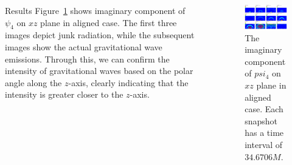 \documentclass[noamssymb]{beamer}
\newlength{\sepwidth}
\newlength{\colwidth}
\newcommand{\separatorcolumn}{\begin{column}{\sepwidth}\end{column}}
\begin{document}
\begin{frame}[t]
\begin{columns}[t]
\begin{column}{\colwidth}
\begin{block}{Results}
    Figure~\ref{fig:psi4i} shows imaginary component of $\psi_4$ on $xz$ plane in aligned case. The first three images depict junk radiation, while the subsequent images show the actual gravitational wave emissions. Through this, we can confirm the intensity of gravitational waves based on the polar angle along the $z$-axis, clearly indicating that the intensity is greater closer to the $z$-axis.

  \end{block}


\end{column}

\separatorcolumn

\begin{column}{\colwidth}

  \begin{block}{}
  	
  	\begin{figure}
  		\centering
  		\includegraphics[width=\columnwidth]{img/psi4i}
  		\caption{\label{fig:psi4i}The imaginary component of $psi_4$ on $xz$ plane in aligned case. Each snapshot has a time interval of $34.6706M$.}
  	\end{figure}
	

\end{block}
\end{column}
\end{columns}
\end{frame}
\end{document}

